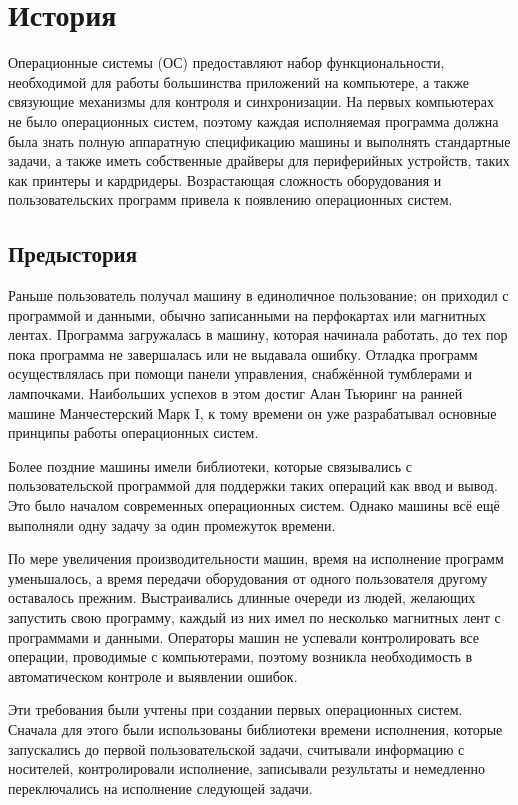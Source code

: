 \section{История}\label{base:os:history}
Операционные системы (ОС) предоставляют набор функциональности, необходимой для работы большинства приложений на компьютере, а также связующие механизмы для контроля и синхронизации. На первых компьютерах не было операционных систем, поэтому каждая исполняемая программа должна была знать полную аппаратную спецификацию машины и выполнять стандартные задачи, а также иметь собственные драйверы для периферийных устройств, таких как принтеры и кардридеры. Возрастающая сложность оборудования и пользовательских программ привела к появлению операционных систем.

\subsection{Предыстория}\label{base:os:history:prehistory}
Раньше пользователь получал машину в единоличное пользование; он приходил с программой и данными, обычно записанными на перфокартах или магнитных лентах. Программа загружалась в машину, которая начинала работать, до тех пор пока программа не завершалась или не выдавала ошибку. Отладка программ осуществлялась при помощи панели управления, снабжённой тумблерами и лампочками. Наибольших успехов в этом достиг Алан Тьюринг на ранней машине Манчестерский Марк I, к тому времени он уже разрабатывал основные принципы работы операционных систем.

Более поздние машины имели библиотеки, которые связывались с пользовательской программой для поддержки таких операций как ввод и вывод. Это было началом современных операционных систем. Однако машины всё ещё выполняли одну задачу за один промежуток времени.

По мере увеличения производительности машин, время на исполнение программ уменьшалось, а время передачи оборудования от одного пользователя другому оставалось прежним. Выстраивались длинные очереди из людей, желающих запустить свою программу, каждый из них имел по несколько магнитных лент с программами и данными. Операторы машин не успевали контролировать все операции, проводимые с компьютерами, поэтому возникла необходимость в автоматическом контроле и выявлении ошибок.

Эти требования были учтены при создании первых операционных систем. Сначала для этого были использованы библиотеки времени исполнения, которые запускались до первой пользовательской задачи, считывали информацию с носителей, контролировали исполнение, записывали результаты и немедленно переключались на исполнение следующей задачи.

